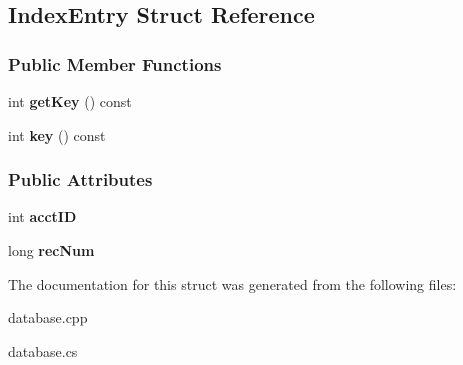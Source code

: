 \hypertarget{struct_index_entry}{}\subsection{Index\+Entry Struct Reference}
\label{struct_index_entry}
\subsubsection*{Public Member Functions}
\begin{DoxyCompactItemize}
\item 
int {\bfseries get\+Key} () const \hypertarget{struct_index_entry_a3113d3d2d211df008978f2b1833c11df}{}\label{struct_index_entry_a3113d3d2d211df008978f2b1833c11df}

\item 
int {\bfseries key} () const \hypertarget{struct_index_entry_a274d78fa2ce3487b8f072dcb6daa8757}{}\label{struct_index_entry_a274d78fa2ce3487b8f072dcb6daa8757}

\end{DoxyCompactItemize}
\subsubsection*{Public Attributes}
\begin{DoxyCompactItemize}
\item 
int {\bfseries acct\+ID}\hypertarget{struct_index_entry_aa5008695f70f365c7959d42ccca0fa13}{}\label{struct_index_entry_aa5008695f70f365c7959d42ccca0fa13}

\item 
long {\bfseries rec\+Num}\hypertarget{struct_index_entry_a3f71077b699f2d718ca60df893c4c470}{}\label{struct_index_entry_a3f71077b699f2d718ca60df893c4c470}

\end{DoxyCompactItemize}


The documentation for this struct was generated from the following files\+:\begin{DoxyCompactItemize}
\item 
database.\+cpp\item 
database.\+cs\end{DoxyCompactItemize}
